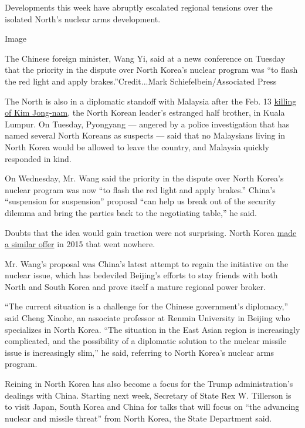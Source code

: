 Developments this week have abruptly escalated regional tensions over
the isolated North's nuclear arms development.

Image

The Chinese foreign minister, Wang Yi, said at a news conference on
Tuesday that the priority in the dispute over North Korea's nuclear
program was ``to flash the red light and apply brakes.''Credit...Mark
Schiefelbein/Associated Press

The North is also in a diplomatic standoff with Malaysia after the Feb.
13
\href{https://www.nytimes3xbfgragh.onion/2017/02/22/world/asia/kim-jong-nam-assassination-korea-malaysia.html}{killing
of Kim Jong-nam}, the North Korean leader's estranged half brother, in
Kuala Lumpur. On Tuesday, Pyongyang --- angered by a police
investigation that has named several North Koreans as suspects --- said
that no Malaysians living in North Korea would be allowed to leave the
country, and Malaysia quickly responded in kind.

On Wednesday, Mr. Wang said the priority in the dispute over North
Korea's nuclear program was now ``to flash the red light and apply
brakes.'' China's ``suspension for suspension'' proposal ``can help us
break out of the security dilemma and bring the parties back to the
negotiating table,'' he said.

Doubts that the idea would gain traction were not surprising. North
Korea
\href{https://www.nytimes3xbfgragh.onion/2015/01/11/world/asia/north-korea-offers-us-deal-to-halt-nuclear-test-.html}{made
a similar offer} in 2015 that went nowhere.

Mr. Wang's proposal was China's latest attempt to regain the initiative
on the nuclear issue, which has bedeviled Beijing's efforts to stay
friends with both North and South Korea and prove itself a mature
regional power broker.

``The current situation is a challenge for the Chinese government's
diplomacy,'' said Cheng Xiaohe, an associate professor at Renmin
University in Beijing who specializes in North Korea. ``The situation in
the East Asian region is increasingly complicated, and the possibility
of a diplomatic solution to the nuclear missile issue is increasingly
slim,'' he said, referring to North Korea's nuclear arms program.

Reining in North Korea has also become a focus for the Trump
administration's dealings with China. Starting next week, Secretary of
State Rex W. Tillerson is to visit Japan, South Korea and China for
talks that will focus on ``the advancing nuclear and missile threat''
from North Korea, the State Department said.

